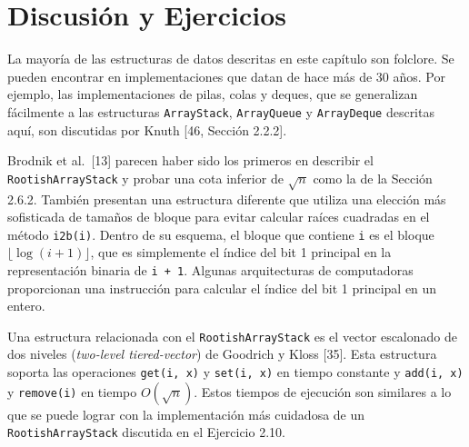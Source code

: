 \documentclass[11pt]{book}
\theoremstyle{plain}
\begin{document}
\section{Discusión y Ejercicios}

La mayoría de las estructuras de datos descritas en este capítulo son folclore. Se pueden encontrar en implementaciones que datan de hace más de 30 años. Por ejemplo, las implementaciones de pilas, colas y deques, que se generalizan fácilmente a las estructuras \texttt{ArrayStack}, \texttt{ArrayQueue} y \texttt{ArrayDeque} descritas aquí, son discutidas por Knuth [46, Sección 2.2.2].

Brodnik et al.\ [13] parecen haber sido los primeros en describir el \texttt{RootishArrayStack} y probar una cota inferior de $\sqrt{n}$ como la de la Sección 2.6.2. También presentan una estructura diferente que utiliza una elección más sofisticada de tamaños de bloque para evitar calcular raíces cuadradas en el método \texttt{i2b(i)}. Dentro de su esquema, el bloque que contiene \texttt{i} es el bloque $\lfloor\log(i + 1)\rfloor$, que es simplemente el índice del bit 1 principal en la representación binaria de \texttt{i + 1}. Algunas arquitecturas de computadoras proporcionan una instrucción para calcular el índice del bit 1 principal en un entero.

Una estructura relacionada con el \texttt{RootishArrayStack} es el vector escalonado de dos niveles (\emph{two-level tiered-vector}) de Goodrich y Kloss [35]. Esta estructura soporta las operaciones \texttt{get(i, x)} y \texttt{set(i, x)} en tiempo constante y \texttt{add(i, x)} y \texttt{remove(i)} en tiempo $O(\sqrt{n})$. Estos tiempos de ejecución son similares a lo que se puede lograr con la implementación más cuidadosa de un \texttt{RootishArrayStack} discutida en el Ejercicio 2.10.
\end{document}
